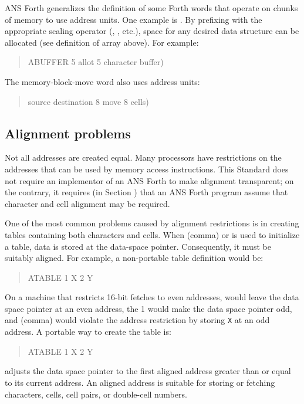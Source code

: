 ANS Forth generalizes the definition of some Forth words that operate
on chunks of memory to use address units. One example is .
By prefixing  with the appropriate scaling operator
(, , etc.), space for any desired data structure
can be allocated (see definition of array above). For example:
\begin{quote}\ttfamily
	 ABUFFER 5  
	 allot 5 character buffer)
\end{quote}
The memory-block-move word also uses address units:
\begin{quote}\ttfamily
source destination 8    move 8 cells)
\end{quote}


\subsection{Alignment problems} %

Not all addresses are created equal. Many processors have restrictions
on the addresses that can be used by memory access instructions. This
Standard does not require an implementor of an ANS Forth to make
alignment transparent; on the contrary, it requires (in Section
) that an ANS Forth
program assume that character and cell alignment may be required.

 One of the most common problems caused by alignment restrictions
 is in creating tables containing both characters and cells. When
 \word{,} (comma) or  is used to initialize a table, data
 is stored at the data-space pointer. Consequently, it must be
 suitably aligned. For example, a non-portable table definition
 would be:
\begin{quote}\ttfamily
	 ATABLE 1  X \word{,} 2  Y \word{,}
\end{quote}
On a machine that restricts 16-bit fetches to even addresses,
 would leave the data space pointer at an even address,
the 1  would make the data space pointer odd, and \word{,}
(comma) would violate the address restriction by storing \texttt{X}
at an odd address. A portable way to create the table is:
\begin{quote}\ttfamily
	 ATABLE 1 
		 X \word{,} 2   Y \word{,}
\end{quote}
 adjusts the data space pointer to the first aligned
address greater than or equal to its current address. An aligned
address is suitable for storing or fetching characters, cells, cell
pairs, or double-cell numbers.

